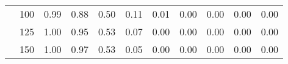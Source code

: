 \begin{table}[t]
\begin{center}
\begin{subtable}[c]{\textwidth}
\begin{center}
\begin{tabular}{rcccccccccc}
                                        & \multicolumn{1}{c|}{100}  & \num{0.99}  & \num{0.88}  & \num{0.50}  & \num{0.11}  & \num{0.01}  & \num{0.00}  & \num{0.00}  & \num{0.00}  & \num{0.00}  \\
                                        & \multicolumn{1}{c|}{125}  & \num{1.00}  & \num{0.95}  & \num{0.53}  & \num{0.07}  & \num{0.00}  & \num{0.00}  & \num{0.00}  & \num{0.00}  & \num{0.00}  \\
                                        & \multicolumn{1}{c|}{150}  & \num{1.00}  & \num{0.97}  & \num{0.53}  & \num{0.05}  & \num{0.00}  & \num{0.00}  & \num{0.00}  & \num{0.00}  & \num{0.00}  \\
                                    \end{tabular}
            \end{center}
        \end{subtable}

        \vspace{5mm}


\end{center}
\end{table}
